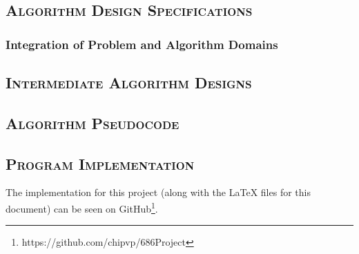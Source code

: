 \documentclass[conference]{IEEEtran}
\begin{document}
\subsection{\textsc{Algorithm Design Specifications}} \label{sec:designSpec}


\subsubsection{Integration of Problem and Algorithm Domains}




\subsection{\textsc{Intermediate Algorithm Designs}} \label{sec:intermedDesign}


\subsection{\textsc{Algorithm Pseudocode}} \label{sec:pseudocode}


\subsection{\textsc{Program Implementation}} \label{sec:code}

The implementation for this project (along with the {\LaTeX} files for this
document) can be seen on GitHub\footnote{https://github.com/chipvp/686Project}.
\end{document}
